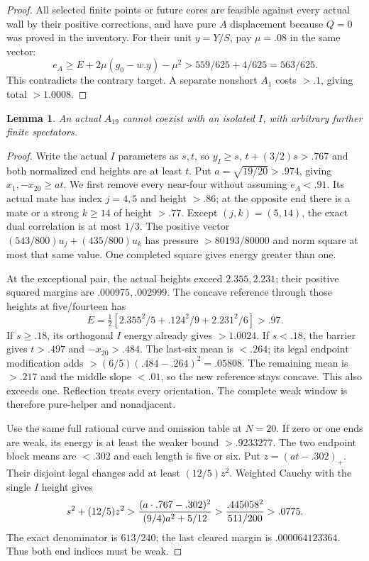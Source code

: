\documentclass[11pt]{article}
\newtheorem{lemma}[theorem]{Lemma}
\theoremstyle{definition}
\theoremstyle{remark}
\begin{document}
\begin{proof}
All selected finite points or future cores are feasible against
every actual wall by their positive corrections, and have pure
$A$ displacement because $Q=0$ was proved in the inventory.
For their unit $y=Y/S$, pay $\mu=.08$ in the same vector:
\[
 e_A\ge E+2\mu(g_0-w.y)-\mu^2
 >559/625+4/625=563/625.
\]
This contradicts the contrary target. A separate nonshort $A_1$
costs $>.1$, giving total $>1.0008$.
\end{proof}

\begin{lemma}
\label{app:tail:lem:A19I}
An actual $A_{19}$ cannot coexist with an isolated $I$, with
arbitrary further finite spectators.
\end{lemma}
\begin{proof}
Write the actual $I$ parameters as $s,t$, so $y_I\ge s$,
$t+(3/2)s>.767$ and both normalized end heights are at least $t$.
Put $a=\sqrt{19/20}>.974$, giving $x_1,-x_{20}\ge at$.
We first remove every near-four without assuming $e_A<.91$.
Its actual mate has index $j=4,5$ and height $>.86$; at the
opposite end there is a mate or a strong $k\ge14$ of height $>.77$.
Except $(j,k)=(5,14)$, the exact dual correlation is at most $1/3$.
The positive vector $(543/800)u_j+(435/800)u_k$ has pressure
$>80193/80000$ and norm square at most that same value.
One completed square gives energy greater than one.

At the exceptional pair, the actual heights exceed $2.355,2.231$;
their positive squared margins are $.000975,.002999$.
The concave reference through those heights at five/fourteen has
\[
 E=\tfrac12[2.355^2/5+.124^2/9+2.231^2/6]>.97.
\]
If $s\ge.18$, its orthogonal $I$ energy already gives $>1.0024$.
If $s<.18$, the barrier gives $t>.497$ and $-x_{20}>.484$.
The last-six mean is $<.264$; its legal endpoint modification adds
$>(6/5)(.484-.264)^2=.05808$. The remaining mean is $>.217$
and the middle slope $<.01$, so the new reference stays concave.
This also exceeds one. Reflection treats every orientation. The
complete weak window is therefore pure-helper and nonadjacent.

Use the same full rational curve and omission table at $N=20$.
If zero or one ends are weak, its energy is at least the weaker
bound $>.9233277$. The two endpoint block means are $<.302$ and
each length is five or six. Put $z=(at-.302)_+$.
Their disjoint legal changes add at least $(12/5)z^2$.
Weighted Cauchy with the single $I$ height gives
\[
 s^2+(12/5)z^2>
 {(a\cdot.767-.302)^2\over(9/4)a^2+5/12}
 >{.445058^2\over511/200}>.0775.
\]
The exact denominator is $613/240$; the last cleared margin is
$.000064123364$. Thus both end indices must be weak.


\end{proof}
\end{document}
